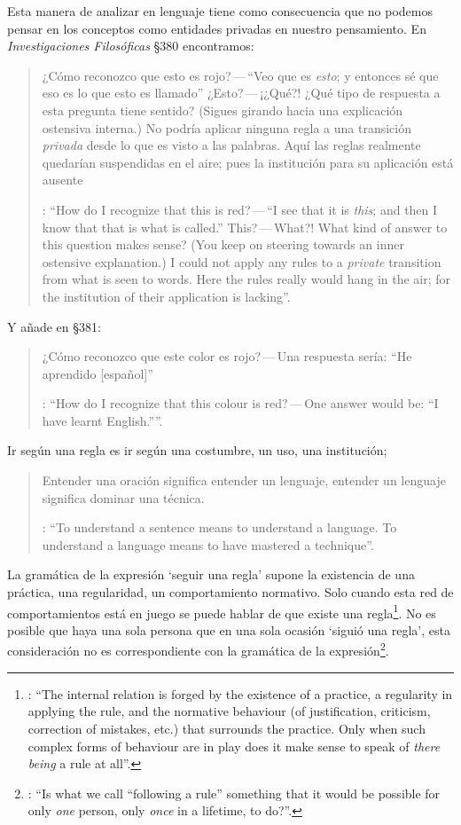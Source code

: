 Esta manera de analizar en lenguaje tiene como consecuencia que no podemos pensar en los conceptos como entidades privadas en nuestro pensamiento. En \emph{Investigaciones Filosóficas} \S380 encontramos: \blockquote[{\Cite[\S380]{wittgenstein1953phiinv}}: \enquote{How do I recognize that this is red?\,---\,``I see that it is \emph{this}; and then I know that that is what is called.'' This?\,---\,What?! What kind of answer to this question makes sense? (You keep on steering towards an inner ostensive explanation.) I could not apply any rules to a \emph{private} transition from what is seen to words. Here the rules really would hang in the air; for the institution of their application is lacking}.]{¿Cómo reconozco que esto es rojo?\,---\,``Veo que es \emph{esto}; y entonces sé que eso es lo que esto es llamado'' ¿Esto?\,---\,¡¿Qué?! ¿Qué tipo de respuesta a esta pregunta tiene sentido? (Sigues girando hacia una explicación ostensiva interna.) No podría aplicar ninguna regla a una transición \emph{privada} desde lo que es visto a las palabras. Aquí las reglas realmente quedarían suspendidas en el aire; pues la institución para su aplicación está ausente}.

Y añade en \S381: \blockquote[{\Cite[\S381]{wittgenstein1953phiinv}}: \enquote{How do I recognize that this colour is red?\,---\,One answer would be: ``I have learnt English.''}.]{¿Cómo reconozco que este color es rojo?\,---\,Una respuesta sería: ``He aprendido [español]''}. Ir según una regla es ir según una costumbre, un uso, una institución; \blockquote[{\Cite[\S199]{wittgenstein1953phiinv}}: \enquote{To understand a sentence means to understand a language. To understand a language means to have mastered a technique}.]{Entender una oración significa entender un lenguaje, entender un lenguaje significa dominar una técnica.} La gramática de la expresión `seguir una regla' supone la existencia de una práctica, una regularidad, un comportamiento normativo. Solo cuando esta red de comportamientos está en juego se puede hablar de que existe una regla\footnote{\cite[Cf.][p.~14]{bakerhacker2009understanding}: \enquote{The internal relation is forged by the existence of a practice, a regularity in applying the rule, and the normative behaviour (of justification, criticism, correction of mistakes, etc.) that surrounds the practice. Only when such complex forms of behaviour are in play does it make sense to speak of \emph{there being} a rule at all}.}. No es posible que haya una sola persona que en una sola ocasión `siguió una regla', esta consideración no es correspondiente con la gramática de la expresión\footnote{\cite[Cf.][\S199]{wittgenstein1953phiinv}: \enquote{Is what we call ``following a rule'' something that it would be possible for only \emph{one} person, only \emph{once} in a lifetime, to do?}.}.

